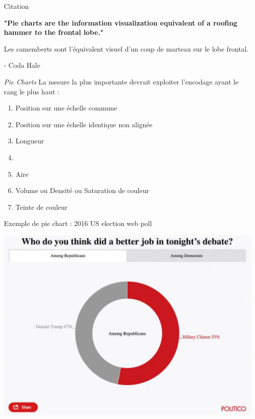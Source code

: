 \documentclass[french]{beamer}
\newcommand\red[1]{{\color{ulred}{\textbf{#1}}}}
\begin{document}
\begin{frame}{Citation}
\begin{center}\begin{large}\textbf{
			"Pie charts are the information visualization equivalent of a roofing hammer to the frontal lobe."
}\end{large}\end{center}

Les camemberts sont l'équivalent visuel d'un coup de marteau sur le lobe frontal.

\vspace{1cm}
- Coda Hale
\end{frame}

\begin{frame}{\emph{Pie Charts}}
La mesure la plus importante devrait exploiter l'encodage ayant le rang le plus haut :
\begin{enumerate}
	\item Position sur une échelle commune
	\item Position sur une échelle identique non alignée
	\item Longueur
	\item \red{Angle ou pente}
	\item Aire
	\item Volume ou Densité ou Saturation de couleur
	\item Teinte de couleur
\end{enumerate}
\end{frame}

\begin{frame}{Exemple de pie chart : 2016 US election web poll}
\begin{center}
	\includegraphics[height=0.8\textheight]{rep}
\end{center}
\end{frame}
\end{document}
